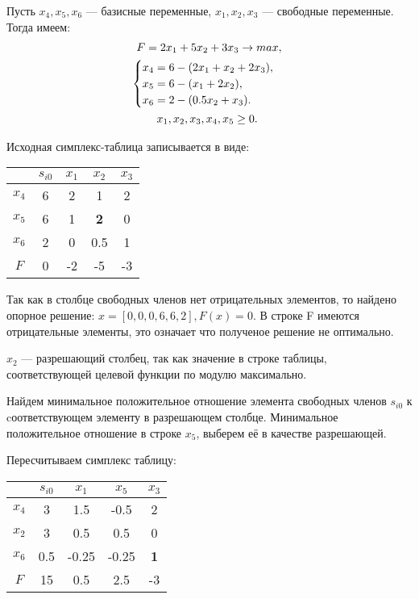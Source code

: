 \documentclass[12pt,a4paper,oneside]{extarticle}
\begin{document}
    Пусть $x_4,x_5,x_6$ --- базисные переменные, $x_1,x_2,x_3$ --- свободные переменные. Тогда имеем:
    \begin{gather}
        F = 2x_1+5x_2+3x_3 \rightarrow max,  \notag  \\
        \begin{cases}
            x_4 = 6 - (2x_1 + x_2 + 2x_3), \\
            x_5 = 6 - (x_1 + 2x_2),\\
            x_6 = 2 - (0.5x_2 + x_3).
        \end{cases} 
        \notag \\ x_1, x_2, x_3, x_4, x_5 \geq 0. \
    \end{gather} 

    Исходная симплекс-таблица записывается в виде:
    \begin{center}
        \begin{tabular}{|c|c|c|c|c|}
            \hline
                 & $s_{i0}$ & $x_1$ & $x_2$ & $x_3$ \\ \hline
            $x_4$ & 6       & 2     & 1     & 2 \\ \hline
            $x_5$ & 6       & 1     &{\bf 2}& 0 \\ \hline
            $x_6$ & 2       & 0     & 0.5   & 1 \\ \hline
            $F$   & 0       & -2    & -5    & -3 \\ \hline
        \end{tabular}
    \end{center}

    Так как в столбце свободных членов нет отрицательных элементов, то найдено опорное решение: $x=[0, 0, 0, 6, 6, 2], F(x)=0$. В строке F имеются отрицательные элементы, это означает что полученое решение не оптимально.

    $x_2$ --- разрешающий столбец, так как значение в строке таблицы, соответствующей целевой функции по модулю максимально.

    Найдем минимальное положительное отношение элемента свободных членов $s_{i0}$ к cоответствующем элементу в разрешающем столбце. Минимальное положительное отношение в строке $x_5$, выберем её в качестве разрешающей.

    Пересчитываем симплекс таблицу:
    \begin{center}
        \begin{tabular}{|c|c|c|c|c|}
            \hline
                 & $s_{i0}$ & $x_1$ & $x_5$ & $x_3$ \\ \hline
            $x_4$ & 3       & 1.5   & -0.5  & 2  \\ \hline
            $x_2$ & 3       & 0.5   & 0.5   & 0  \\ \hline
            $x_6$ & 0.5     & -0.25 & -0.25 &{\bf 1}\\ \hline
            $F$   & 15      & 0.5   & 2.5   & -3 \\ \hline
        \end{tabular}
    \end{center}
\end{document}
